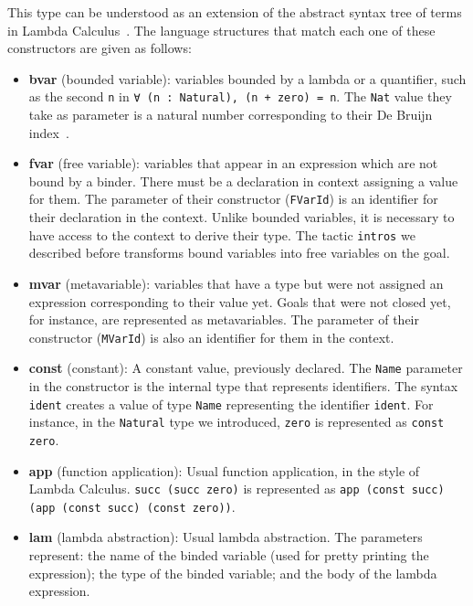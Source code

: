 This type can be understood as an extension of the abstract syntax tree of terms in Lambda Calculus~\cite{lcIntro}. The language structures that match each one of these constructors are given as follows:
\begin{itemize}
  \item \textbf{bvar} (bounded variable): variables bounded by a lambda or a quantifier, such as the second \texttt{n} in  \texttt{∀ (n : Natural), (n + zero) = n}. The \texttt{Nat} value they take as parameter is a natural number corresponding to their De Bruijn index~\cite{debruijnIndices}.
  \item \textbf{fvar} (free variable): variables that appear in an expression which are not bound by a binder. There must be a declaration in context assigning a value for them.  The parameter of their constructor (\texttt{FVarId}) is an identifier for their declaration in the context. Unlike bounded variables, it is necessary to have access to the context to derive their type. The tactic \texttt{intros} we described before transforms bound variables into free variables on the goal.
  \item \textbf{mvar} (metavariable): variables that have a type but were not assigned an expression corresponding to their value yet. Goals that were not closed yet, for instance, are represented as metavariables. The parameter of their constructor (\texttt{MVarId}) is also an identifier for them in the context.
  \item \textbf{const} (constant): A constant value, previously declared. The \texttt{Name} parameter in the constructor is the internal type that represents identifiers. The syntax \texttt{\textasciigrave ident} creates a value of type \texttt{Name} representing the identifier \texttt{ident}. For instance, in the \texttt{Natural} type we introduced, \texttt{zero} is represented as \texttt{const \textasciigrave zero}.
  \item \textbf{app} (function application): Usual function application, in the style of Lambda Calculus. \texttt{succ (succ zero)} is represented as \texttt{app (const \textasciigrave succ) (app (const \textasciigrave succ) (const \textasciigrave zero))}.
  \item \textbf{lam} (lambda abstraction): Usual lambda abstraction. The parameters represent: the name of the binded variable (used for pretty printing the expression); the type of the binded variable; and the body of the lambda expression.

\end{itemize}
